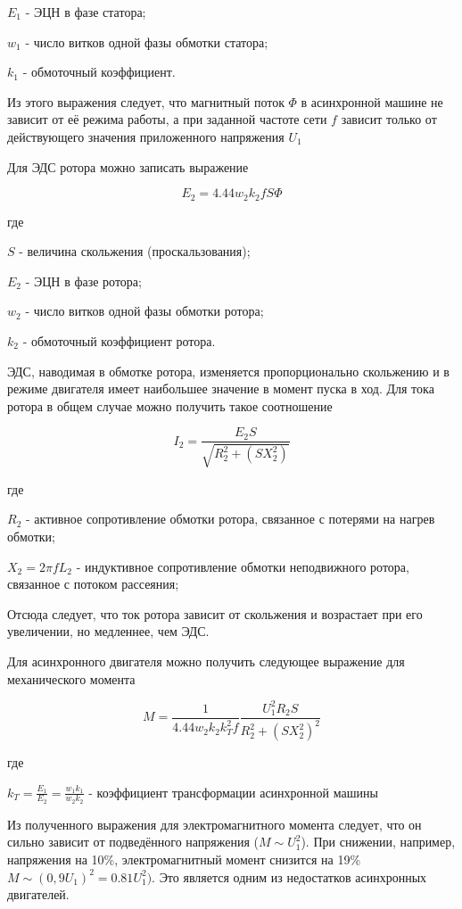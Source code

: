 \documentclass[]{scrreprt}
\begin{document}
 $E_1$	- ЭЦН в фазе статора;
 
 $w_1$ - число витков одной фазы обмотки статора;
 
 $k_1$  - обмоточный коэффициент.
   
Из этого выражения следует, что магнитный поток $\Phi $ в асинхронной машине не зависит от её режима работы, а при заданной частоте сети $f$ зависит только от действующего значения приложенного напряжения $U_1$


Для ЭДС ротора можно записать выражение 

$$  E_2 = 4.44 w_2 k_2 f S \Phi $$

где 


$S$ - величина скольжения (проскальзования);

$E_2$	- ЭЦН в фазе ротора;

$w_2$ - число витков одной фазы обмотки ротора;

$k_2$ - обмоточный коэффициент ротора.

ЭДС, наводимая в обмотке ротора, изменяется пропорционально скольжению и в режиме двигателя имеет наибольшее значение в момент пуска в ход.
Для тока ротора в общем случае можно получить такое соотношение

$$  I_2 = \frac{E_2 S}{\sqrt{R_2^2+(S X_2^2)}} $$

где 

$R_2$ -  активное сопротивление обмотки ротора, связанное с потерями на нагрев обмотки;  

$X_2 = 2 \pi f L_2$ - индуктивное сопротивление обмотки неподвижного ротора, связанное с потоком рассеяния;

Отсюда следует, что ток ротора зависит от скольжения и возрастает при его увеличении, но медленнее, чем ЭДС.

Для асинхронного двигателя можно получить следующее выражение для механического момента 

$$ M = \frac{1}{4.44 w_2 k_2 k_T^2 f} \frac{U_1^2 R_2 S}{R_2^2 + (S X_2^2)^2}$$

где 

$k_T = \frac{E_1}{E_2} = \frac{w_1 k_1}{w_2 k_2}$ - коэффициент трансформации асинхронной машины

Из полученного выражения для электромагнитного момента следует, что он сильно зависит от подведённого напряжения ($M \sim U_1^2$). При снижении, например, напряжения на 10\%, электромагнитный момент снизится на 19\% $M \sim (0,9U_1)^2=0.81 U_1^2)$. Это является одним из недостатков асинхронных двигателей. 
\end{document}
